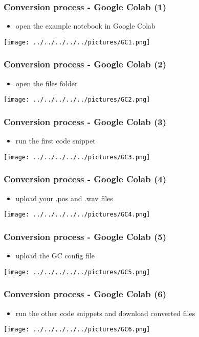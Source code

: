 \documentclass[12pt,a4paper]{beamer}
\begin{document}
\begin{frame}
    \frametitle{Conversion process - Google Colab (1)}
    \begin{itemize}
        \item open the example notebook in Google Colab
    \end{itemize}
    \centering
    \texttt{[image: ../../../../../pictures/GC1.png]}
\end{frame}

\begin{frame}
    \frametitle{Conversion process - Google Colab (2)}
    \begin{itemize}
        \item open the files folder
    \end{itemize}
    \centering
    \texttt{[image: ../../../../../pictures/GC2.png]}
\end{frame}

\begin{frame}
    \frametitle{Conversion process - Google Colab (3)}
    \begin{itemize}
        \item run the first code snippet
    \end{itemize}
    \centering
    \texttt{[image: ../../../../../pictures/GC3.png]}
\end{frame}

\begin{frame}
    \frametitle{Conversion process - Google Colab (4)}
    \begin{itemize}
        \item upload your .pos and .wav files
    \end{itemize}
    \centering
    \texttt{[image: ../../../../../pictures/GC4.png]}
\end{frame}

\begin{frame}
    \frametitle{Conversion process - Google Colab (5)}
    \begin{itemize}
        \item upload the GC config file
    \end{itemize}
    \centering
    \texttt{[image: ../../../../../pictures/GC5.png]}
\end{frame}

\begin{frame}
    \frametitle{Conversion process - Google Colab (6)}
    \begin{itemize}
        \item run the other code snippets and download converted files
    \end{itemize}
    \centering
    \texttt{[image: ../../../../../pictures/GC6.png]}
\end{frame}
\end{document}
